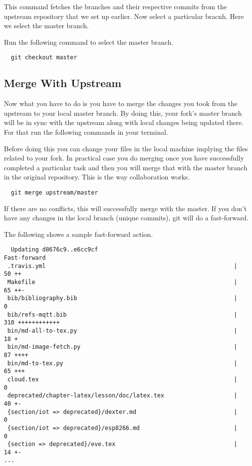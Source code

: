 This command fetches the branches and their respective commits from
the upstream repository that we set up earlier. Now select a
particular bracnh.  Here we select the master branch.

Run the following command to select the master branch.

\begin{lstlisting}
  git checkout master
\end{lstlisting}

\subsection{Merge With Upstream}

Now what you have to do is you have to merge the changes you took from
the upstream to your local master branch. By doing this, your fork's
master branch will be in sync with the upstream along with local
changes being updated there. For that run the following commands in
your terminal.

Before doing this you can change your files in the local machine
implying the files related to your fork. In practical case you do
merging once you have successfully completed a particular task and
then you will merge that with the master branch in the original
repository. This is the way collaboration works.

\begin{lstlisting}
  git merge upstream/master
\end{lstlisting}

If there are no conflicts, this will successfully merge with the master. 
If you don't have any changes in the local branch (unique commits), git
will do a fast-forward.

The following shows a sample fast-forward action. 
\begin{lstlisting}
  Updating d8676c9..e6cc9cf
Fast-forward
 .travis.yml                                                      |   50 ++
 Makefile                                                         |   65 ++-
 bib/bibliography.bib                                             |    0
 bib/refs-mqtt.bib                                                |  310 ++++++++++++
 bin/md-all-to-tex.py                                             |   18 +
 bin/md-image-fetch.py                                            |   87 ++++
 bin/md-to-tex.py                                                 |   65 +++
 cloud.tex                                                        |    0
 deprecated/chapter-latex/lesson/doc/latex.tex                    |   40 +-
 {section/iot => deprecated}/dexter.md                            |    0
 {section/iot => deprecated}/esp8266.md                           |    0
 {section => deprecated}/eve.tex                                  |   14 +-
...
\end{lstlisting}

